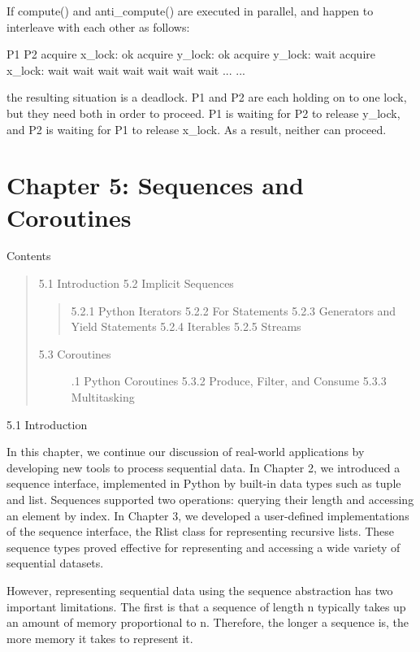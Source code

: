 \documentclass[letterpaper,10pt,dvipdfmx]{sphinxmanual}
\begin{document}
If compute() and anti\_compute() are executed in parallel, and happen to interleave with each other as follows:

P1                          P2
acquire x\_lock: ok          acquire y\_lock: ok
acquire y\_lock: wait        acquire x\_lock: wait
wait                        wait
wait                        wait
wait                        wait
...                         ...

the resulting situation is a deadlock. P1 and P2 are each holding on to one lock, but they need both in order to proceed. P1 is waiting for P2 to release y\_lock, and P2 is waiting for P1 to release x\_lock. As a result, neither can proceed.


\chapter{Chapter 5: Sequences and Coroutines}
\label{streams:chapter-5-sequences-and-coroutines}\label{streams::doc}
Contents
\begin{quote}

5.1   Introduction
5.2   Implicit Sequences
\begin{quote}

5.2.1   Python Iterators
5.2.2   For Statements
5.2.3   Generators and Yield Statements
5.2.4   Iterables
5.2.5   Streams
\end{quote}
\begin{description}
\item[{5.3   Coroutines}] .1   Python Coroutines
5.3.2   Produce, Filter, and Consume
5.3.3   Multitasking

\end{description}
\end{quote}

5.1   Introduction

In this chapter, we continue our discussion of real-world applications by developing new tools to process sequential data. In Chapter 2, we introduced a sequence interface, implemented in Python by built-in data types such as tuple and list. Sequences supported two operations: querying their length and accessing an element by index. In Chapter 3, we developed a user-defined implementations of the sequence interface, the Rlist class for representing recursive lists. These sequence types proved effective for representing and accessing a wide variety of sequential datasets.

However, representing sequential data using the sequence abstraction has two important limitations. The first is that a sequence of length n typically takes up an amount of memory proportional to n. Therefore, the longer a sequence is, the more memory it takes to represent it.
\end{document}
